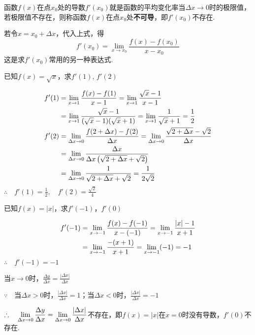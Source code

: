 函数$f(x)$在点$x_0$处的导数$f'(x_0)$就是函数的平均变化率当$\Delta x\to 0$时的极限值，若极限值不存在，则称函数$f(x)$在点$x_0$处\textbf{不可导}，即$f'(x_0)$不存在. 

若令$x=x_0+\Delta x$，代入上式，得
\[f'(x_0)=\lim_{x\to x_0}\frac{f(x)-f(x_0)}{x- x_0}\]
这是求$f'(x_0)$常用的另一种表达式.


\begin{example}
    已知$f(x)=\sqrt{x}$，求$f'(1)$, $f'(2)$
\end{example}

\begin{solution}
\[\begin{split}
f'(1)&=\lim\limits_{x\to 1}\dfrac{f(x)-f(1)}{x-1}=\lim\limits_{x\to 1}\dfrac{\sqrt{x}-1}{x-1}\\
&=\lim\limits_{x\to 1}\dfrac{\sqrt{x}-1}{(\sqrt{x}-1)(\sqrt{x}+1)}=\lim\limits_{x\to 1}\dfrac{1}{\sqrt{x}+1}=\dfrac{1}{2}\\
f'(2)&=\lim\limits_{\Delta x\to 0}\dfrac{f(2+\Delta x)-f(2)}{\Delta x}=\lim\limits_{\Delta x\to 0}\dfrac{\sqrt{2+\Delta x}-\sqrt{2}}{\Delta x}\\
&=\lim\limits_{\Delta x\to 0}\dfrac{\Delta x}{\Delta x\left(\sqrt{2+\Delta x}+\sqrt{2}\right)}\\
&=\lim\limits_{\Delta x\to 0}\dfrac{1}{\sqrt{2+\Delta x}+\sqrt{2}}=\dfrac{1}{2\sqrt{2}}
\end{split}\]
$\therefore\quad f'(1)=\frac{1}{2},\quad f'(2)=\frac{\sqrt{2}}{4}$
\end{solution}

\begin{example}
已知$f(x)=|x|$，求$f'(-1)$，$f'(0)$
\end{example}

\begin{solution}
\[\begin{split}
    f'(-1)&=\lim\limits_{x\to -1}\dfrac{f(x)-f(-1)}{x-(-1)}= \lim\limits_{x\to -1}\dfrac{|x|-1}{x+1}\\
    &=\lim\limits_{x\to -1}\dfrac{-(x+1)}{x+1}=\lim\limits_{x\to -1}(-1)=-1
\end{split} \]
$\therefore\quad f'(-1)=-1$

当$x\to 0$时，$\frac{\Delta y}{\Delta x}=\frac{|\Delta x|}{\Delta x}$

$\because\quad $当$\Delta x>0$时，$\frac{|\Delta x|}{\Delta x}=1$；当$\Delta x<0$时，$\frac{|\Delta x|}{\Delta x}=-1$

$\therefore\quad \lim\limits_{\Delta x\to 0}\dfrac{\Delta y}{\Delta x}=\lim\limits_{\Delta x\to 0}\dfrac{|\Delta x|}{\Delta x}$不存在，即$f(x)=|x|$在$x=0$时没有导数，$f'(0)$不存在.
\end{solution}


